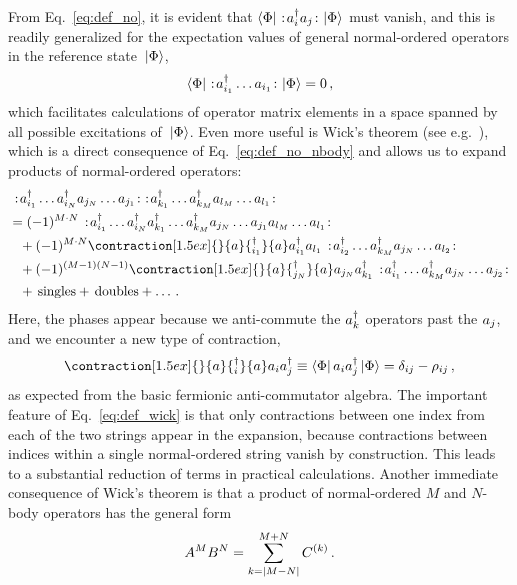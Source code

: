 From Eq.~\eqref{eq:def_no}, it is evident that $\langle{\Phi}|\,{\,:\!{{a}}^{\dag}_ia_j\!:\,}\,|{\Phi}\rangle$ must vanish, and this is readily generalized for the expectation values of general normal-ordered operators in the reference state $\,|{\Phi}\rangle$,
\begin{equation}
  \langle{\Phi}|\,{\,:\!{{a}}^{\dag}_{i_1}\ldots a_{i_1}\!:\,}\,|{\Phi}\rangle = 0\,,
\end{equation}
which facilitates calculations of operator matrix elements in a space spanned by all possible excitations of $\,|{\Phi}\rangle$. Even more useful is Wick's theorem (see e.g.~\cite{Shavitt:2009}), which is a direct consequence of Eq.~\eqref{eq:def_no_nbody} and allows us to expand products of normal-ordered operators:
\begin{align}\label{eq:def_wick}
   & \nord{\aaO_{i_1}\ldots\aaO_{i_N}\aO_{j_{N}}\ldots\aO_{j_{1}}} 
     \nord{\aaO_{k_1}\ldots\aaO_{k_M}\aO_{l_{M}}\ldots\aO_{l_{1}}}
   \notag\\
    &=(-1)^{M\cdot N}  
     \nord{\aaO_{i_1}\ldots\aaO_{i_N}\aaO_{k_1}\ldots\aaO_{k_M}\aO_{j_{N}}\ldots\aO_{j_{1}}\aO_{l_{M}}\ldots\aO_{l_{1}}} 
    \notag\\
    &\hphantom{=}
       + (-1)^{M\cdot N}\contraction[1.5ex]{}{\aO}{{}^\dag_{i_1}}{\aO}\aaO_{i_1}\aO_{l_1} 
        \nord{\aaO_{i_2}\ldots\aaO_{k_M}\aO_{j_{N}}\ldots\aO_{l_{2}}} \notag\\
    &\hphantom{\equiv}
      + (-1)^{(M-1)(N-1)}\contraction[1.5ex]{}{\aO}{{}^\dag_{j_N}}{\aO}\aO_{j_N}\aaO_{k_1} 
        \nord{\aaO_{i_1}\ldots\aaO_{k_M}\aO_{j_{N}}\ldots\aO_{j_2}}
      \notag\\
    &\hphantom{=}
      + \text{\,singles}+ \text{\,doubles} + \ldots \,.
\end{align}
Here, the phases appear because we anti-commute the ${{a}}^{\dag}_k$ operators past the $a_j$, and we encounter a new type of contraction,
\begin{equation}\label{eq:def_hole_contraction}
  \contraction[1.5ex]{}{\aO}{{}^\dag_{i}}{\aO}\aO_{i}\aaO_{j} 
  \equiv \matrixe{\Phi}{\aO_{i}\aaO_{j}}{\Phi}
  = \delta_{ij} - \rho_{ij}\,,
\end{equation}
as expected from the basic fermionic anti-commutator algebra. The important feature of Eq.~\eqref{eq:def_wick} is that only contractions between one index from each of the two strings appear in the expansion, because contractions between indices within a single normal-ordered string vanish by construction. This leads to a substantial reduction of terms in practical calculations. Another immediate consequence of Wick's theorem is that a product of normal-ordered $M$ and $N$-body operators has the general form
\begin{equation}
  A^{M}B^{N} = \sum_{k=|M-N|}^{M+N}C^{(k)}\,.
\end{equation}


